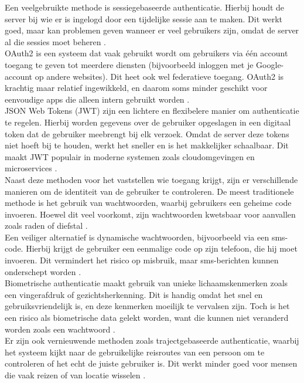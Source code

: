 Een veelgebruikte methode is sessiegebaseerde authenticatie. Hierbij houdt de server bij wie er is ingelogd door een tijdelijke sessie aan te maken. Dit werkt goed, maar kan problemen geven wanneer er veel gebruikers zijn, omdat de server al die sessies moet beheren \autocite{Balaj2017}.\\

OAuth2 is een systeem dat vaak gebruikt wordt om gebruikers via één account toegang te geven tot meerdere diensten (bijvoorbeeld inloggen met je Google-account op andere websites). Dit heet ook wel federatieve toegang. OAuth2 is krachtig maar relatief ingewikkeld, en daarom soms minder geschikt voor eenvoudige apps die alleen intern gebruikt worden \autocite{Balaj2017}.\\

JSON Web Tokens (JWT) zijn een lichtere en flexibelere manier om authenticatie te regelen. Hierbij worden gegevens over de gebruiker opgeslagen in een digitaal token dat de gebruiker meebrengt bij elk verzoek. Omdat de server deze tokens niet hoeft bij te houden, werkt het sneller en is het makkelijker schaalbaar. Dit maakt JWT populair in moderne systemen zoals cloudomgevingen en microservices \autocite{Balaj2017}.\\

Naast deze methoden voor het vaststellen wie toegang krijgt, zijn er verschillende manieren om de identiteit van de gebruiker te controleren. De meest traditionele methode is het gebruik van wachtwoorden, waarbij gebruikers een geheime code invoeren. Hoewel dit veel voorkomt, zijn wachtwoorden kwetsbaar voor aanvallen zoals raden of diefstal \autocite{Zukarnain2022}.\\

Een veiliger alternatief is dynamische wachtwoorden, bijvoorbeeld via een sms-code. Hierbij krijgt de gebruiker een eenmalige code op zijn telefoon, die hij moet invoeren. Dit vermindert het risico op misbruik, maar sms-berichten kunnen onderschept worden \autocite{Zukarnain2022}.\\

Biometrische authenticatie maakt gebruik van unieke lichaamskenmerken zoals een vingerafdruk of gezichtsherkenning. Dit is handig omdat het snel en gebruiksvriendelijk is, en deze kenmerken moeilijk te vervalsen zijn. Toch is het een risico als biometrische data gelekt worden, want die kunnen niet veranderd worden zoals een wachtwoord \autocite{Zukarnain2022}.\\

Er zijn ook vernieuwende methoden zoals trajectgebaseerde authenticatie, waarbij het systeem kijkt naar de gebruikelijke reisroutes van een persoon om te controleren of het echt de juiste gebruiker is. Dit werkt minder goed voor mensen die vaak reizen of van locatie wisselen \autocite{Zukarnain2022}.\\

